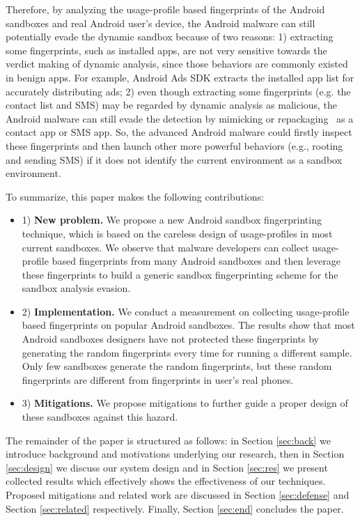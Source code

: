 Therefore, by analyzing the usage-profile based fingerprints of the Android sandboxes and real Android user's device, the Android malware can still potentially evade the dynamic sandbox because of two reasons: 1) extracting some fingerprints, such as installed apps, are not very sensitive towards the verdict making of dynamic analysis, since those behaviors are commonly existed in benign apps. For example, Android Ads SDK extracts the installed app list for accurately distributing ads; 2) even though extracting some fingerprints (e.g. the contact list and SMS) may be regarded by dynamic analysis as malicious, the Android malware can still evade the detection by mimicking or repackaging~\cite{zhang2014viewdroid} as a contact app or SMS app. So, the advanced Android malware could firstly inspect these fingerprints and then launch other more powerful behaviors (e.g., rooting and sending SMS) if it does not identify the current environment as a sandbox environment.


To summarize, this paper makes the following contributions:
\begin{itemize}
\item 1) {\bf New problem.} We propose a new Android sandbox fingerprinting technique, which is based on the careless design of usage-profiles in most current sandboxes. We observe that malware developers can collect usage-profile based fingerprints from many Android sandboxes and then leverage these fingerprints to build a generic sandbox fingerprinting scheme for the sandbox analysis evasion. 
\item 2) {\bf Implementation.} We conduct a measurement on collecting usage-profile based fingerprints on popular Android sandboxes. The results show that most Android sandboxes designers have not protected these fingerprints by generating the random fingerprints every time for running a different sample. Only few sandboxes generate the random fingerprints, but these random fingerprints are different from fingerprints in user's real phones.
\item 3) {\bf Mitigations.} We propose mitigations to further guide a proper design of these sandboxes against this hazard.
\end{itemize}

The remainder of the paper is structured as follows: in Section \ref{sec:back} we introduce background and motivations underlying our research, then in Section \ref{sec:design} we discuss our system design and in Section \ref{sec:res} we present collected results which effectively shows the effectiveness of our techniques. Proposed mitigations and related work are discussed in Section \ref{sec:defense} and Section \ref{sec:related} respectively. Finally, Section \ref{sec:end} concludes the paper.